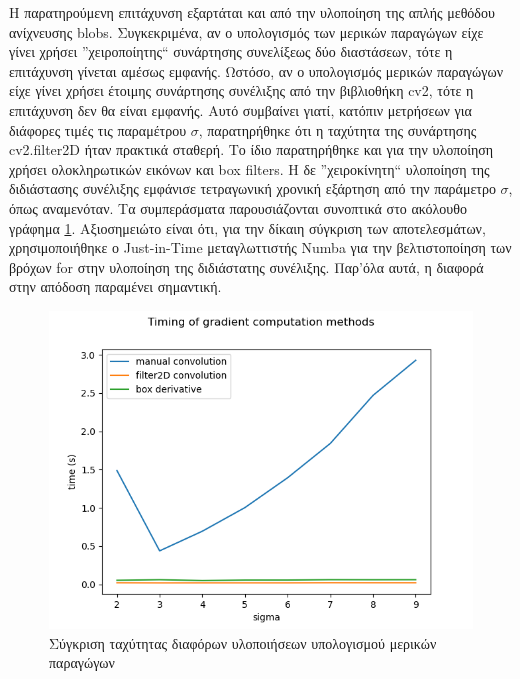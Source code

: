 \documentclass{article}
\newcommand{\eng}[1]{\foreignlanguage{english}{#1}}
\begin{document}
Η παρατηρούμενη επιτάχυνση εξαρτάται και από την υλοποίηση της απλής μεθόδου ανίχνευσης \eng{blobs}. Συγκεκριμένα, αν ο υπολογισμός των μερικών παραγώγων είχε γίνει χρήσει ''χειροποίητης`` συνάρτησης συνελίξεως δύο διαστάσεων, τότε η επιτάχυνση γίνεται αμέσως εμφανής. Ωστόσο, αν ο υπολογισμός μερικών παραγώγων είχε γίνει χρήσει έτοιμης συνάρτησης συνέλιξης από την βιβλιοθήκη \eng{cv2}, τότε η επιτάχυνση δεν θα είναι εμφανής. Αυτό συμβαίνει γιατί, κατόπιν μετρήσεων για διάφορες τιμές τις παραμέτρου $\sigma$, παρατηρήθηκε ότι η ταχύτητα της συνάρτησης  \eng{cv2.filter2D} ήταν πρακτικά σταθερή. Το ίδιο παρατηρήθηκε και για την υλοποίηση χρήσει ολοκληρωτικών εικόνων και \eng{box filters}. Η δε ''χειροκίνητη`` υλοποίηση της διδιάστασης συνέλιξης εμφάνισε τετραγωνική χρονική εξάρτηση από την παράμετρο $\sigma$, όπως αναμενόταν. Τα συμπεράσματα παρουσιάζονται συνοπτικά στο ακόλουθο γράφημα \ref{fig:grad-comparison}. Αξιοσημειώτο είναι ότι, για την δίκαιη σύγκριση των αποτελεσμάτων, χρησιμοποιήθηκε ο \eng{Just-in-Time} μεταγλωττιστής \eng{Numba} για την βελτιστοποίηση των βρόχων \eng{for} στην υλοποίηση της διδιάστατης συνέλιξης. Παρ'όλα αυτά, η διαφορά στην απόδοση παραμένει σημαντική.

\begin{figure}[h]
    \centering
    \includegraphics[width=\textwidth]{../image-plots/grad-comparison.png}
    \caption{Σύγκριση ταχύτητας διαφόρων υλοποιήσεων υπολογισμού μερικών παραγώγων}
    \label{fig:grad-comparison}
\end{figure}
\FloatBarrier
\end{document}
